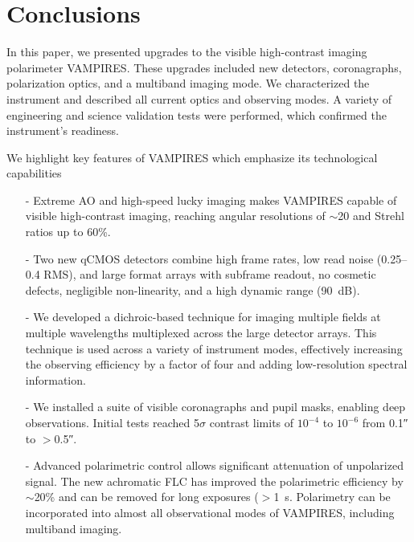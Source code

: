 \section{Conclusions}\label{sec:conclusions}

In this paper, we presented upgrades to the visible high-contrast imaging polarimeter VAMPIRES. These upgrades included new detectors, coronagraphs, polarization optics, and a multiband imaging mode. We characterized the instrument and described all current optics and observing modes. A variety of engineering and science validation tests were performed, which confirmed the instrument's readiness.

We highlight key features of VAMPIRES which emphasize its technological capabilities
\begin{itemize}
    \item[-] Extreme AO and high-speed lucky imaging makes VAMPIRES capable of visible high-contrast imaging, reaching angular resolutions of $\sim$\SI{20}{\mas} and Strehl ratios up to 60\%.
    \item[-] Two new qCMOS detectors combine high frame rates, low read noise (\SIrange{0.25}{0.4}{\electron} RMS), and large format arrays with subframe readout, no cosmetic defects, negligible non-linearity, and a high dynamic range (\SI{90}{\deci\bel}).
    \item[-] We developed a dichroic-based technique for imaging multiple fields at multiple wavelengths multiplexed across the large detector arrays. This technique is used across a variety of instrument modes, effectively increasing the observing efficiency by a factor of four and adding low-resolution spectral information.
    \item[-] We installed a suite of visible coronagraphs and pupil masks, enabling deep observations. Initial tests reached 5$\sigma$ contrast limits of $10^{-4}$ to $10^{-6}$ from \ang{;;0.1} to $>$\ang{;;0.5}.
    \item[-] Advanced polarimetric control allows significant attenuation of unpolarized signal. The new achromatic FLC has improved the polarimetric efficiency by $\sim$20\% and can be removed for long exposures ($>$\SI{1}{\second}. Polarimetry can be incorporated into almost all observational modes of VAMPIRES, including multiband imaging.
\end{itemize}


